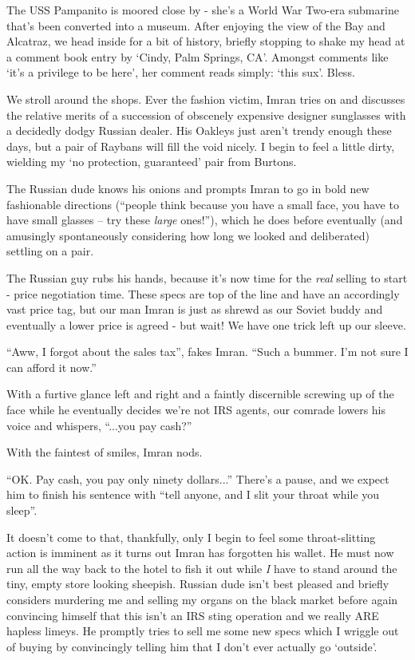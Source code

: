 \documentclass[a5paper,titlepage,11pt,draft]{book}
\begin{document}
The USS Pampanito is moored close by - she's a World War Two-era submarine that's been converted into a museum. After enjoying the view of the Bay and Alcatraz, we head inside for a bit of history, briefly stopping to shake my head at a comment book entry by `Cindy, Palm Springs, CA'.  Amongst comments like `it's a privilege to be here', her comment reads simply: `this sux'.  Bless.

We stroll around the shops.  Ever the fashion victim, Imran tries on and discusses the relative merits of a succession of obscenely expensive designer sunglasses with a decidedly dodgy Russian dealer.  His Oakleys just aren't trendy enough these days, but a pair of Raybans will fill the void nicely.  I begin to feel a little dirty, wielding my  `no protection, guaranteed' pair from Burtons.

The Russian dude knows his onions and prompts Imran to go in bold new fashionable directions (``people think because you have a small face, you have to have small glasses -- try these \emph{large} ones!''), which he does before eventually (and amusingly spontaneously considering how long we looked and deliberated) settling on a pair.

The Russian guy rubs his hands, because it's now time for the \emph{real} selling to start - price negotiation time.  These specs are top of the line and have an accordingly vast price tag, but our man Imran is just as shrewd as our Soviet buddy and eventually a lower price is agreed - but wait!  We have one trick left up our sleeve.

``Aww, I forgot about the sales tax'', fakes Imran.  ``Such a bummer.  I'm not sure I can afford it now.''

With a furtive glance left and right and a faintly discernible screwing up of the face while he eventually decides we're not IRS agents, our comrade lowers his voice and whispers, ``...you pay cash?''

With the faintest of smiles, Imran nods.

``OK.  Pay cash, you pay only ninety dollars...'' There's a pause, and we expect him to finish his sentence with ``tell anyone, and I slit your throat while you sleep''.

It doesn't come to that, thankfully, only I begin to feel some throat-slitting action is imminent as it turns out Imran has forgotten his wallet.  He must now run all the way back to the hotel to fish it out while \emph{I} have to stand around the tiny, empty store looking sheepish.  Russian dude isn't best pleased and briefly considers murdering me and selling my organs on the black market before again convincing himself that this isn't an IRS sting operation and we really ARE hapless limeys.  He promptly tries to sell me some new specs which I wriggle out of buying by convincingly telling him that I don't ever actually go `outside'.
\end{document}
